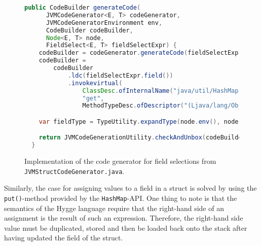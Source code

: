 \begin{figure}
    \centering
    \begin{lstlisting}[language=Java]
  public CodeBuilder generateCode(
      JVMCodeGenerator<E, T> codeGenerator,
      JVMCodeGeneratorEnvironment env,
      CodeBuilder codeBuilder,
      Node<E, T> node,
      FieldSelect<E, T> fieldSelectExpr) {
    codeBuilder = codeGenerator.generateCode(fieldSelectExpr.target(), env, codeBuilder);
    codeBuilder =
        codeBuilder
            .ldc(fieldSelectExpr.field())
            .invokevirtual(
                ClassDesc.ofInternalName("java/util/HashMap"),
                "get",
                MethodTypeDesc.ofDescriptor("(Ljava/lang/Object;)Ljava/lang/Object;"));

    var fieldType = TypeUtility.expandType(node.env(), node.type());

    return JVMCodeGenerationUtility.checkAndUnbox(codeBuilder, fieldType);
  }
    \end{lstlisting}
    \caption{Implementation of the code generator for field selections from \texttt{JVMStructCodeGenerator.java}.}
    \label{fig:jvm_constructor_builder}
\end{figure}

Similarly, the case for assigning values to a field in a struct is solved by using the \texttt{put()}-method provided
by the \texttt{HashMap}-API. One thing to note is that the semantics of the Hygge language require that the right-hand side
of an assignment is the result of such an expression. Therefore, the right-hand side value must be duplicated, stored and
then be loaded back onto the stack after having updated the field of the struct.

\begin{figure}[H]
  \centering
  \begin{lstlisting}[language=Java]
    
  \end{lstlisting}
  \caption{}
  \label{fig:jvm_field_assignment}
\end{figure}
